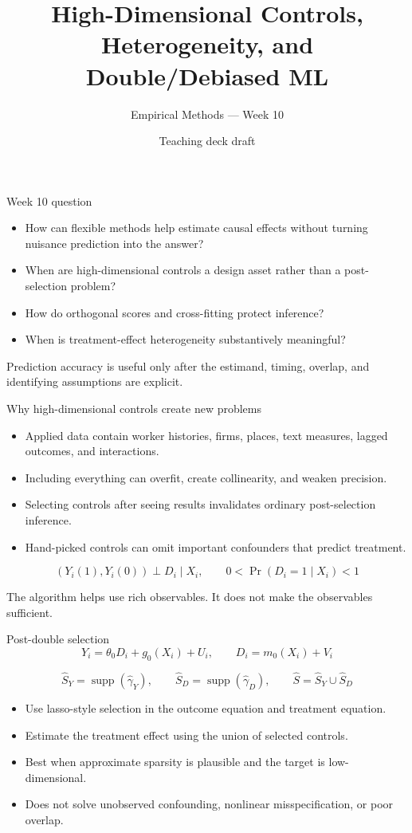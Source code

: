 \documentclass[aspectratio=169,11pt]{beamer}
\title{High-Dimensional Controls, Heterogeneity, and Double/Debiased ML}
\subtitle{Empirical Methods --- Week 10}
\author{Teaching deck draft}
\date{}
\newcommand{\1}{\mathbf{1}}
\newcommand{\supp}{\operatorname{supp}}
\begin{document}
\begin{frame}
  \titlepage
\end{frame}

\begin{frame}{Week 10 question}
\begin{itemize}
    \item How can flexible methods help estimate causal effects without turning nuisance prediction into the answer?
    \item When are high-dimensional controls a design asset rather than a post-selection problem?
    \item How do orthogonal scores and cross-fitting protect inference?
    \item When is treatment-effect heterogeneity substantively meaningful?
\end{itemize}

\medskip
Prediction accuracy is useful only after the estimand, timing, overlap, and identifying assumptions are explicit.
\end{frame}

\begin{frame}{Why high-dimensional controls create new problems}
\small
\begin{itemize}
    \item Applied data contain worker histories, firms, places, text measures, lagged outcomes, and interactions.
    \item Including everything can overfit, create collinearity, and weaken precision.
    \item Selecting controls after seeing results invalidates ordinary post-selection inference.
    \item Hand-picked controls can omit important confounders that predict treatment.
\end{itemize}

\medskip
\[
(Y_i(1),Y_i(0)) \perp D_i \mid X_i,
\qquad
0<\Pr(D_i=1\mid X_i)<1
\]

\medskip
The algorithm helps use rich observables. It does not make the observables sufficient.
\end{frame}

\begin{frame}{Post-double selection}
\small
\[
Y_i=\theta_0D_i+g_0(X_i)+U_i,
\qquad
D_i=m_0(X_i)+V_i
\]

\[
\widehat S_Y=\supp(\widehat\gamma_Y),
\qquad
\widehat S_D=\supp(\widehat\gamma_D),
\qquad
\widehat S=\widehat S_Y\cup \widehat S_D
\]

\begin{itemize}
    \item Use lasso-style selection in the outcome equation and treatment equation.
    \item Estimate the treatment effect using the union of selected controls.
    \item Best when approximate sparsity is plausible and the target is low-dimensional.
    \item Does not solve unobserved confounding, nonlinear misspecification, or poor overlap.
\end{itemize}
\end{frame}
\end{document}
